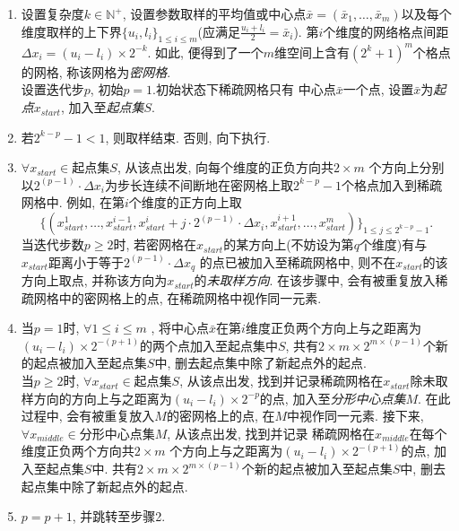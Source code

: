 \documentclass[a4paper,punct=banjiao,twoside]{ctexrep}
\theoremstyle{plain}
\theoremstyle{definition}
\theoremstyle{remark}
\begin{document}
\begin{enumerate}
  \item 设置复杂度$k\in \mathbb{N}^+ $, 设置参数取样的平均值或中心点$\bar{x} = (\bar{x}_1 ,\dots, \bar{x}_m)$以及每个维度取样的上下界$\{u_i,l_i\}_{1 \leq i \leq m}$(应满足$\frac{u_i+l_i}{2}=\bar{x}_i$).
  第$i$个维度的网络格点间距$\Delta x_i = (u_i - l_i)\times 2^{-k}$. 如此, 便得到了一个$m$维空间上含有$(2^k+1)^m$个格点的网格, 称该网格为\textit{密网格}.\\
  设置迭代步$p$, 初始$p = 1$.初始状态下稀疏网格只有
  中心点$\bar{x}$一个点, 设置$\bar{x}$为\textit{起点}$x_{start}$, 加入至\textit{起点集}$S$.
  \item 若$2^{k-p}-1 < 1$, 则取样结束. 否则, 向下执行.
  \item $\forall x_{start} \in \textit{起点集}S$, 从该点出发, 向每个维度的正负方向共$2\times m$ 个方向上分别以$2^{(p-1)} \cdot \Delta x_i$为步长连续不间断地在密网格上取$2^{k-p}-1$个格点加入到稀疏网格中.
  例如, 在第$i$个维度的正方向上取
  $$
  \{( x_{start}^1,\dots,x_{start}^{i-1},x_{start}^i+j\cdot 2^{(p-1)} \cdot  \Delta x_i, x_{start}^{i+1},\dots,x_{start}^m)\}_{1 \leq j \leq 2^{k-p}-1}.
  $$
  当迭代步数$p \geq 2$时, 若密网格在$x_{start}$的某方向上(不妨设为第$q$个维度)有与$x_{start}$距离小于等于$2^{(p-1)} \cdot \Delta x_q$
  的点已被加入至稀疏网格中, 则不在$x_{start}$的该方向上取点, 并称该方向为$x_{start}$的\textit{未取样方向}. 在该步骤中, 会有被重复放入稀疏网格中的密网格上的点, 在稀疏网格中视作同一元素.
  
  \item 
  当$p = 1$时, $\forall 1 \leq i \leq m$ , 将中心点$\bar{x}$在第$i$维度正负两个方向上与之距离为$(u_i - l_i)\times 2^{-(p+1)}$的两个点加入至起点集中$S$, 共有$2\times m\times 2^{m\times (p-1)}$个新的起点被加入至起点集$S$中, 删去起点集中除了新起点外的起点.\\
  当$p \geq 2$时, $\forall x_{start} \in \textit{起点集}S$, 从该点出发, 找到并记录稀疏网格在$x_{start}$除未取样方向的方向上与之距离为$(u_i - l_i)\times 2^{-p}$的点, 加入至\textit{分形中心点集}$M$.
  在此过程中, 会有被重复放入$M$的密网格上的点, 在$M$中视作同一元素. 接下来, $\forall x_{middle} \in \textit{分形中心点集}M$, 从该点出发, 找到并记录
  稀疏网格在$x_{middle}$在每个维度正负两个方向共$2\times m$ 个方向上与之距离为$(u_i - l_i)\times 2^{-(p+1)}$的点, 加入至起点集$S$中.
  共有$2\times m\times 2^{m\times (p-1)}$个新的起点被加入至起点集$S$中, 删去起点集中除了新起点外的起点. 

  \item $p = p + 1$, 并跳转至步骤2.
  \end{enumerate}
\end{document}
